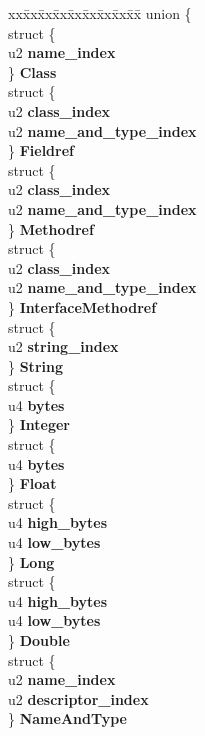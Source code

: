 \begin{DoxyCompactItemize}
\item 
\begin{tabbing}
xx\=xx\=xx\=xx\=xx\=xx\=xx\=xx\=xx\=\kill
union \{\\
\>struct \{\\
\>\>u2 {\bfseries name\_index}\\
\>\} {\bfseries Class}\\
\>struct \{\\
\>\>u2 {\bfseries class\_index}\\
\>\>u2 {\bfseries name\_and\_type\_index}\\
\>\} {\bfseries Fieldref}\\
\>struct \{\\
\>\>u2 {\bfseries class\_index}\\
\>\>u2 {\bfseries name\_and\_type\_index}\\
\>\} {\bfseries Methodref}\\
\>struct \{\\
\>\>u2 {\bfseries class\_index}\\
\>\>u2 {\bfseries name\_and\_type\_index}\\
\>\} {\bfseries InterfaceMethodref}\\
\>struct \{\\
\>\>u2 {\bfseries string\_index}\\
\>\} {\bfseries String}\\
\>struct \{\\
\>\>u4 {\bfseries bytes}\\
\>\} {\bfseries Integer}\\
\>struct \{\\
\>\>u4 {\bfseries bytes}\\
\>\} {\bfseries Float}\\
\>struct \{\\
\>\>u4 {\bfseries high\_bytes}\\
\>\>u4 {\bfseries low\_bytes}\\
\>\} {\bfseries Long}\\
\>struct \{\\
\>\>u4 {\bfseries high\_bytes}\\
\>\>u4 {\bfseries low\_bytes}\\
\>\} {\bfseries Double}\\
\>struct \{\\
\>\>u2 {\bfseries name\_index}\\
\>\>u2 {\bfseries descriptor\_index}\\
\>\} {\bfseries NameAndType}\\

\end{tabbing}
\end{DoxyCompactItemize}
